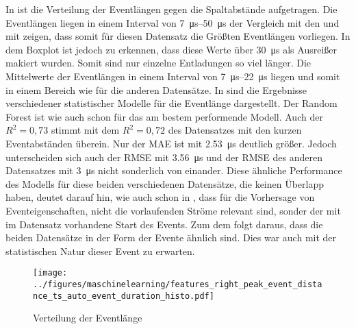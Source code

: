 In  ist die Verteilung der Eventlängen gegen die Spaltabstände aufgetragen. Die Eventlängen liegen in einem Interval von \SIrange{7}{50}{\micro\second} der Vergleich mit den  und mit  zeigen, dass somit für diesen Datensatz die Größten Eventlängen vorliegen. In dem Boxplot ist jedoch zu erkennen, dass diese Werte über \SI{30}{\micro\second} als Ausreißer makiert wurden. Somit sind nur einzelne Entladungen so viel länger. Die Mittelwerte der Eventlängen in einem Interval von \SIrange{7}{22}{\micro\second} liegen und somit in einem Bereich wie für die anderen Datensätze. In  sind die Ergebnisse verschiedener statistischer Modelle für die Eventlänge dargestellt. Der Random Forest ist wie auch schon für  das am bestem performende Modell. Auch der \(R^2 = 0,73\) stimmt mit dem \(R^2 = 0,72\) des Datensatzes mit den kurzen Eventabständen überein. Nur der MAE ist mit \SI{2,53}{\micro\second} deutlich größer. Jedoch unterscheiden sich auch der RMSE mit \SI{3,56}{\micro\second} und der RMSE des anderen Datensatzes mit \SI{3}{\micro\second} nicht sonderlich von einander. Diese ähnliche Performance des Modells für diese beiden verschiedenen Datensätze, die keinen Überlapp haben, deutet darauf hin, wie auch schon in , dass für die Vorhersage von Eventeigenschaften, nicht die vorlaufenden Ströme relevant sind, sonder der mit im Datensatz vorhandene Start des Events. Zum dem folgt daraus, dass die beiden Datensätze in der Form der Evente ähnlich sind. Dies war auch mit der statistischen Natur dieser Event zu erwarten.

\begin{figure}[H]
    \centering
      \texttt{[image: ../figures/maschinelearning/features\_right\_peak\_event\_distance\_ts\_auto\_event\_duration\_histo.pdf]}
      \caption{Verteilung der Eventlänge}
      \label{fig:event_right_event_duration_box}
\end{figure}


\begin{table}[h!]
\centering
\caption{Model Performance für die Vorhersage der Eventlänge}
\label{tab:long_event_duration}
\end{table}




